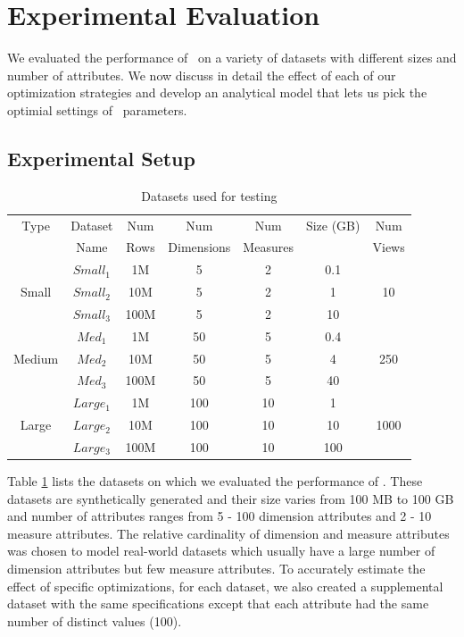 
\section{Experimental Evaluation}

We evaluated the performance of \SeeDB\ on a variety of datasets with different
sizes and number of attributes. We now discuss in detail the effect of
each of our optimization strategies and develop an analytical model that lets us
pick the optimial settings of \SeeDB\ parameters.

\subsection{Experimental Setup}

\begin{table}[htb]
  \centering \scriptsize
  \begin{tabular}{|c|c|c|c|c|c|c|} \hline
  Type & Dataset & Num  & Num  & Num  & Size (GB) &
  Num \\
  & Name & Rows & Dimensions &  Measures & & Views \\ \hline 
   & $Small_1$ & 1M & 5 & 2 &  0.1 & \\ 
  Small & $Small_2$ & 10M & 5 & 2 &  1 & 10\\ 
   & $Small_3$ & 100M & 5 & 2 &  10 & \\ \hline
   & $Med_1$ & 1M & 50 & 5 &  0.4 & \\
  Medium & $Med_2$ & 10M & 50 & 5 &  4 & 250\\ 
   & $Med_3$ & 100M & 50 & 5 &  40 & \\ \hline
   & $Large_1$ & 1M & 100 & 10 &  1 & \\
  Large & $Large_2$ & 10M & 100 & 10 &  10 & 1000\\
   & $Large_3$ & 100M & 100 & 10 &  100 & \\ \hline
  \end{tabular}
  \caption{Datasets used for testing}
  \label{tab:datasets} 
\end{table}

Table \ref{tab:datasets} lists the datasets on which we evaluated the
performance of \SeeDB. These datasets are synthetically generated and their size
varies from 100 MB to 100 GB and number of attributes ranges from 5 - 100 dimension attributes and 2 -
 10 measure attributes. The relative cardinality of dimension and measure attributes
was chosen to model real-world datasets which usually have a large number of
dimension attributes but few measure attributes. To accurately estimate the
effect of specific optimizations, for each dataset, we also created a
supplemental dataset with the same specifications except that each attribute had
the same number of distinct values (100).

